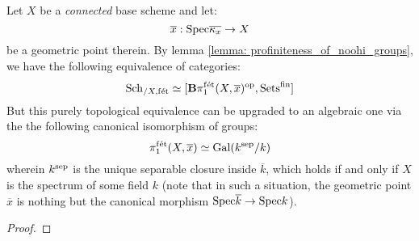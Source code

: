                 \begin{theorem} \label{theorem: grothendieck's_galois_theorem}
                    Let $X$ be a \textit{connected} base scheme and let:
                        $$\overline{x}: \mathrm{Spec} \overline{\kappa_x} \to X$$
                    be a geometric point therein. By lemma \ref{lemma: profiniteness_of_noohi_groups}, we have the following equivalence of categories:
                        $$\mathrm{Sch}_{/X, \mathrm{f\acute{e}t}} \simeq [\mathbf{B}\pi_1^{\mathrm{f\acute{e}t}}(X, \overline{x})^{\mathrm{op}}, \mathrm{Sets}^{\mathrm{fin}}]$$
                    But this purely topological equivalence can be upgraded to an algebraic one via the the following canonical isomorphism of groups:
                        $$\pi_1^{\mathrm{f\acute{e}t}}(X, \overline{x}) \simeq \mathrm{Gal}(k^{\mathrm{sep}}/k)$$
                    wherein $k^{\mathrm{sep}}$ is the unique separable closure inside $\overline{k}$, which holds if and only if $X$ is the spectrum of some field $k$ (note that in such a situation, the geometric point $\overline{x}$ is nothing but the canonical morphism $\mathrm{Spec} \overline{k} \to \mathrm{Spec} k$).
                \end{theorem}
                    \begin{proof}
                        
                    \end{proof}
                    
